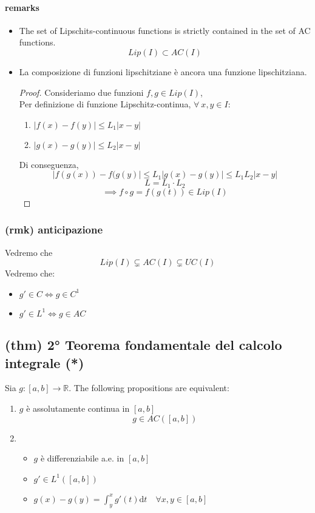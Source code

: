 \paragraph{remarks}
\begin{itemize}
    \item The set of Lipschits-continuous functions is strictly contained in the set of AC functions.$$Lip(I)\subset AC(I)$$    
    \item La composizione di funzioni lipschitziane è ancora una funzione lipschitziana.
    \begin{proof}
    Consideriamo due funzioni $f,g\in Lip(I)$,\\
    Per definizione di funzione Lipschitz-continua,
    $\forall\ x,y\in I$:
    \begin{enumerate}
        \item $|f(x)-f(y)|\leq L_1|x-y|$
        \item $|g(x)-g(y)|\leq L_2|x-y|$
    \end{enumerate}
    Di conseguenza,
    $$|f(g(x))-f(g(y)|\leq L_1|g(x)-g(y)|\leq L_1L_2|x-y|$$
    $$L=L_1\cdot L_2$$
    $$\implies f\circ g=f(g(t))\in Lip(I)$$
    
    \end{proof}
\end{itemize}

\subsubsection{(rmk) anticipazione}
Vedremo che
$$Lip(I)\subsetneq  AC(I)\subsetneq  UC(I)$$
Vedremo che:
\begin{itemize}
    \item $g'\in C\iff g\in C^1$
    \item $g'\in L^1\iff g\in AC$
\end{itemize}
\subsection{(thm) 2° Teorema fondamentale del calcolo integrale (*)}
Sia $g:[a,b]\to \mathbb R$. The following propositions are equivalent:
\begin{enumerate}[label=\roman*]
    \item $g$ è assolutamente continua in $[a,b]$ $$g\in AC([a,b])$$
    \item 
    \begin{itemize}
        \item $g$ è differenziabile a.e. in $[a,b]$
        \item $g'\in L^1([a,b])$
        \item $g(x)-g(y)=\int_y^xg'(t)\mathrm dt\quad \forall x,y\in[a,b]$
    \end{itemize}    
\end{enumerate}
